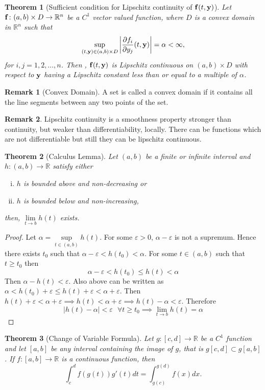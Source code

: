 \documentclass[12pt,reqno]{amsart}
\theoremstyle{plain}
\newtheorem{thm}{Theorem}
\theoremstyle{definition}
\newtheorem{rem}{Remark}
\begin{document}
\begin{thm}[Sufficient condition for Lipschitz continuity of ${\bf f}(t, {\bf y})$]
    Let ${\bf f} \colon (a,b) \times D \to \mathbb{R}^n$ be a $C^1$ vector valued function, where $D$ is a convex domain in $\mathbb{R}^n$ such that
    $$ \sup\limits_{(t, {\bf y}) \in (a,b) \times D} \left|\frac{\partial f_i}{\partial y_j}(t, {\bf y})\right| = \alpha < \infty,$$
    for $i,j = 1,2,\dots, n$. Then , ${\bf f}(t, {\bf y})$ is Lipschitz continuous on $(a,b) \times D$ with respect to ${\bf y}$ having a Lipschitz constant less than or equal to a multiple of $\alpha$.
\end{thm}
\begin{rem}[Convex Domain]
    A set is called a convex domain if it contains all the line segments between any two points of the set.
\end{rem}
\begin{rem}
    Lipschitz continuity is a smoothness property stronger than continuity, but weaker than differentiability, locally. There can be functions which are not differentiable but still they can be lipschitz continuous.
\end{rem}
\begin{thm}[Calculus Lemma]
    Let $(a,b)$ be a finite or infinite interval and $h \colon (a,b) \to \mathbb{R}$ satisfy either
    \begin{enumerate}[(i)]
        \item $h$ is bounded above and non-decreasing or
        \item $h$ is bounded below and non-increasing,
    \end{enumerate}
    then, $\lim\limits_{t \to b} h(t)$ exists.    
\end{thm}
\begin{proof}
    Let $\alpha = \sup\limits_{t \in (a,b)} h(t)$. For some $\varepsilon > 0$, $\alpha - \varepsilon$ is not a supremum. Hence there exists $t_0$ such that $\alpha - \varepsilon < h(t_0) < \alpha$. For some $t \in (a,b)$ such that $t \geq t_0$ then 
    $$\alpha - \varepsilon < h(t_0) \leq h(t) < \alpha$$ 
    Then $\alpha - h(t) < \varepsilon$. Also above can be written as $ \alpha < h(t_0) + \varepsilon \leq h(t) + \varepsilon < \alpha + \varepsilon$. Then $h(t) + \varepsilon < \alpha + \varepsilon \implies h(t) < \alpha + \varepsilon \implies h(t) - \alpha < \varepsilon$. Therefore
    $$ |h(t) - \alpha| < \varepsilon \text{ }\forall t \geq t_0 \implies \lim\limits_{t \to b}h(t) = \alpha$$
\end{proof}
\begin{thm}[Change of Variable Formula]
    Let $g \colon [c,d] \to \mathbb{R}$ be a $C^1$ function and let $[a,b]$ be any interval containing the image of $g$, that is $g[c,d] \subset g[a,b]$. If $f \colon[a,b] \to \mathbb{R}$ is a continuous function, then
    $$ \int_c^d f(g(t))g'(t) dt = \int_{g(c)}^{g(d)} f(x) dx.$$
\end{thm}
\end{document}
